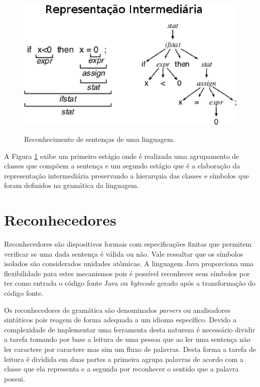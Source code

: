 \begin{figure}[ht]
\centering
\includegraphics[scale=1]{Imagens/rep_intermediaria}
\label{fig:rep_intermediaria}
\caption{Reconhecimento de sentenças de uma linguagem.}
\end{figure}

A Figura \ref{fig:rep_intermediaria} exibe um primeiro estágio onde é realizada uma agrupamento de classes que compõem a sentença e um segundo estágio que é a elaboração da representação intermediária preservando a hierarquia das classes e símbolos que foram definidos na gramática da linguagem.


\section{Reconhecedores}\label{sec:rec}

Reconhecedores são dispositivos formais com especificações finitas que permitem verificar se uma dada sentença é válida ou não. Vale ressaltar que os símbolos isolados são considerados unidades atômicas. A linguagem Java proporciona uma flexibilidade para estes mecanismos pois é possível reconhecer seus símbolos por ter como entrada o código fonte Java ou \textit{bytecode} gerado após a transformação do código fonte.

Os reconhecedores de gramática são denominados \textit{parsers} ou analisadores sintáticos pois reagem de forma adequada a um idioma específico. Devido a complexidade de implementar uma ferramenta desta natureza é necessário dividir a tarefa tomando por base a leitura de uma pessoa que ao ler uma sentença não ler caractere por caractere mas sim um fluxo de palavras. Desta forma a tarefa de leitura é dividida em duas partes a primeira agrupa palavras de acordo com a classe que ela representa e a segunda por reconhecer o sentido que a palavra possui. 

